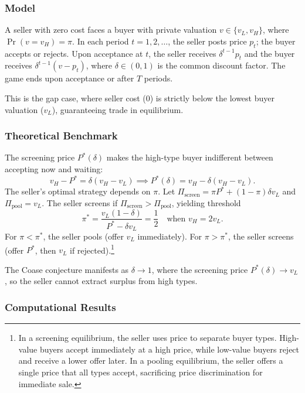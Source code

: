 \subsubsection{Model}

A seller with zero cost faces a buyer with private valuation $v \in \{v_L, v_H\}$, where $\Pr(v = v_H) = \pi$. In each period $t = 1, 2, \ldots$, the seller posts price $p_t$; the buyer accepts or rejects. Upon acceptance at $t$, the seller receives $\delta^{t-1} p_t$ and the buyer receives $\delta^{t-1}(v - p_t)$, where $\delta \in (0,1)$ is the common discount factor. The game ends upon acceptance or after $T$ periods.

This is the gap case, where seller cost (0) is strictly below the lowest buyer valuation ($v_L$), guaranteeing trade in equilibrium.

\subsubsection{Theoretical Benchmark}

The screening price $P^*(\delta)$ makes the high-type buyer indifferent between accepting now and waiting:
\begin{equation}
v_H - P^* = \delta(v_H - v_L) \implies P^*(\delta) = v_H - \delta(v_H - v_L).
\end{equation}
The seller's optimal strategy depends on $\pi$. Let $\Pi_{\text{screen}} = \pi P^* + (1-\pi)\delta v_L$ and $\Pi_{\text{pool}} = v_L$. The seller screens if $\Pi_{\text{screen}} > \Pi_{\text{pool}}$, yielding threshold
\begin{equation}
\pi^* = \frac{v_L(1-\delta)}{P^* - \delta v_L} = \frac{1}{2} \quad \text{when } v_H = 2v_L.
\end{equation}
For $\pi < \pi^*$, the seller pools (offer $v_L$ immediately). For $\pi > \pi^*$, the seller screens (offer $P^*$, then $v_L$ if rejected).\footnote{In a screening equilibrium, the seller uses price to separate buyer types. High-value buyers accept immediately at a high price, while low-value buyers reject and receive a lower offer later. In a pooling equilibrium, the seller offers a single price that all types accept, sacrificing price discrimination for immediate sale.}

The Coase conjecture manifests as $\delta \to 1$, where the screening price $P^*(\delta) \to v_L$, so the seller cannot extract surplus from high types.

\subsubsection{Computational Results}

